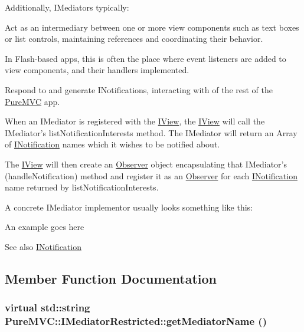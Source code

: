 Additionally, {\ttfamily IMediator}s typically: 
\begin{DoxyItemize}
\item Act as an intermediary between one or more view components such as text boxes or list controls, maintaining references and coordinating their behavior. 
\item In Flash-\/based apps, this is often the place where event listeners are added to view components, and their handlers implemented. 
\item Respond to and generate {\ttfamily INotifications}, interacting with of the rest of the \hyperlink{namespace_pure_m_v_c}{PureMVC} app. 
\end{DoxyItemize}

When an {\ttfamily IMediator} is registered with the {\ttfamily \hyperlink{class_pure_m_v_c_1_1_i_view}{IView}}, the {\ttfamily \hyperlink{class_pure_m_v_c_1_1_i_view}{IView}} will call the {\ttfamily IMediator}'s {\ttfamily listNotificationInterests} method. The {\ttfamily IMediator} will return an {\ttfamily Array} of {\ttfamily \hyperlink{class_pure_m_v_c_1_1_i_notification}{INotification}} names which it wishes to be notified about.

The {\ttfamily \hyperlink{class_pure_m_v_c_1_1_i_view}{IView}} will then create an {\ttfamily \hyperlink{class_pure_m_v_c_1_1_observer}{Observer}} object encapsulating that {\ttfamily IMediator}'s ({\ttfamily handleNotification}) method and register it as an \hyperlink{class_pure_m_v_c_1_1_observer}{Observer} for each {\ttfamily \hyperlink{class_pure_m_v_c_1_1_i_notification}{INotification}} name returned by {\ttfamily listNotificationInterests}.

A concrete IMediator implementor usually looks something like this:

{\ttfamily An example goes here}

\begin{DoxySeeAlso}{See also}
\hyperlink{class_pure_m_v_c_1_1_i_notification}{INotification} 
\end{DoxySeeAlso}


\subsection{Member Function Documentation}
\hypertarget{class_pure_m_v_c_1_1_i_mediator_restricted_a763c71cd6446cb09c2eb55ad91ca28ca}{
\subsubsection[{getMediatorName}]{\setlength{\rightskip}{0pt plus 5cm}virtual std::string PureMVC::IMediatorRestricted::getMediatorName ()}}
\label{class_pure_m_v_c_1_1_i_mediator_restricted_a763c71cd6446cb09c2eb55ad91ca28ca}


